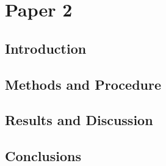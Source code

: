 \chapter{Paper 2}\label{ch:Paper2}
  \section{Introduction}\label{sec:P2Introduction}
    \lipsum[34-36]
  \section{Methods and Procedure}\label{sec:P2methodsAndProcedure}
    \lipsum[46-48]
  \section{Results and Discussion}\label{sec:P2resultsAndDiscussion}
    \lipsum[55-57]
  \section{Conclusions}\label{sec:P2Conclusions}
    \lipsum[12-13]
